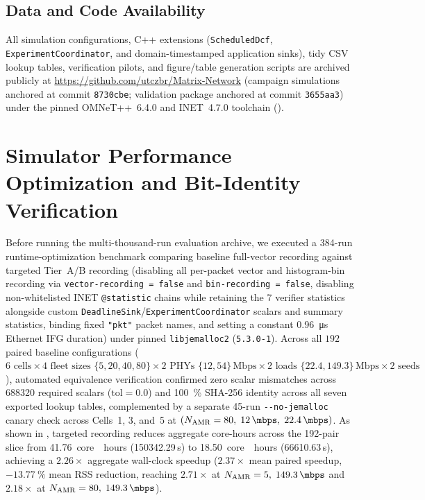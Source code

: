 \documentclass[11pt,a4paper]{article}
\newcommand{\Namr}{\ensuremath{N_{\mathrm{AMR}}}}
\begin{document}
\subsection{Data and Code Availability}
\label{sec:availability}

All simulation configurations, C++ extensions (\texttt{ScheduledDcf}, \texttt{ExperimentCoordinator}, and domain-timestamped application sinks), tidy CSV lookup tables, verification pilots, and figure/table generation scripts are archived publicly at \url{https://github.com/utczbr/Matrix-Network} (campaign simulations anchored at commit \texttt{8730cbe}; validation package anchored at commit \texttt{3655aa3}) under the pinned OMNeT++~6.4.0 and INET~4.7.0 toolchain ().

\FloatBarrier
\appendix

\section{Simulator Performance Optimization and Bit-Identity Verification}
\label{app:speedup}

Before running the multi-thousand-run evaluation archive, we executed a 384-run runtime-optimization benchmark comparing baseline full-vector recording against targeted Tier~A/B recording (disabling all per-packet vector and histogram-bin recording via \texttt{vector-recording = false} and \texttt{bin-recording = false}, disabling non-whitelisted INET \texttt{@statistic} chains while retaining the 7 verifier statistics alongside custom \texttt{DeadlineSink}/\texttt{ExperimentCoordinator} scalars and summary statistics, binding fixed \texttt{"pkt"} packet names, and setting a constant \qty{0.96}{\micro\second} Ethernet IFG duration) under pinned \texttt{libjemalloc2} (\texttt{5.3.0-1}). Across all $192$ paired baseline configurations ($6\text{ cells} \times 4\text{ fleet sizes } \{5, 20, 40, 80\} \times 2\text{ PHYs } \{12, 54\}\,\text{Mbps} \times 2\text{ loads } \{22.4, 149.3\}\,\text{Mbps} \times 2\text{ seeds}$), automated equivalence verification confirmed zero scalar mismatches across \num{688320} required scalars ($\mathrm{tol}=0.0$) and \qty{100}{\percent} SHA-256 identity across all seven exported lookup tables, complemented by a separate 45-run \texttt{-{}-no-jemalloc} canary check across Cells~1, 3, and~5 at $(\Namr=80,\; \qty{12}{\mbps},\; \qty{22.4}{\mbps})$. As shown in , targeted recording reduces aggregate core-hours across the 192-pair slice from \qty{41.76}{core\text{-}hours} (\num{150342.29}\,\si{\second}) to \qty{18.50}{core\text{-}hours} (\num{66610.63}\,\si{\second}), achieving a $2.26\times$ aggregate wall-clock speedup ($2.37\times$ mean paired speedup, $-\qty{13.77}{\percent}$ mean RSS reduction, reaching $2.71\times$ at $\Namr=5,\; \qty{149.3}{\mbps}$ and $2.18\times$ at $\Namr=80,\; \qty{149.3}{\mbps}$).
\end{document}
